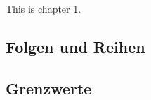 \documentclass[main.tex]{subfiles}
\begin{document}
	
	This is chapter 1.
	
	\subsection{Folgen und Reihen}
	
	\subsection{Grenzwerte}
	
	
\end{document}
